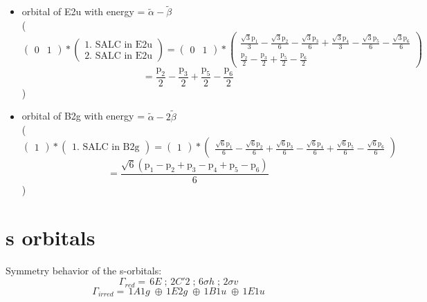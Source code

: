 \documentclass[12pt,a4paper]{article}
\begin{document}
\begin{itemize}
\item orbital of E2u with energy = 
                                $\tilde{\alpha} - \tilde{\beta}$ \\
( 
$$
\begin{pmatrix}0 & 1\end{pmatrix} * \left(\begin{array}{c}\text{1. SALC in E2u} \\ \text{2. SALC in E2u}\end{array}\right) = \begin{pmatrix}0 & 1\end{pmatrix} * \begin{pmatrix}\frac{\sqrt{3} \text{p}_{1}}{3} - \frac{\sqrt{3} \text{p}_{2}}{6} - \frac{\sqrt{3} \text{p}_{3}}{6} + \frac{\sqrt{3} \text{p}_{4}}{3} - \frac{\sqrt{3} \text{p}_{5}}{6} - \frac{\sqrt{3} \text{p}_{6}}{6}\\\frac{\text{p}_{2}}{2} - \frac{\text{p}_{3}}{2} + \frac{\text{p}_{5}}{2} - \frac{\text{p}_{6}}{2}\end{pmatrix} 
 $$ $$ = \frac{\text{p}_{2}}{2} - \frac{\text{p}_{3}}{2} + \frac{\text{p}_{5}}{2} - \frac{\text{p}_{6}}{2} 
 $$ 
 )

\item orbital of B2g with energy = 
                                $\tilde{\alpha} - 2 \tilde{\beta}$ \\
( 
$$
\begin{pmatrix}1\end{pmatrix} * \left(\begin{array}{c}\text{1. SALC in B2g}\end{array}\right) = \begin{pmatrix}1\end{pmatrix} * \begin{pmatrix}\frac{\sqrt{6} \text{p}_{1}}{6} - \frac{\sqrt{6} \text{p}_{2}}{6} + \frac{\sqrt{6} \text{p}_{3}}{6} - \frac{\sqrt{6} \text{p}_{4}}{6} + \frac{\sqrt{6} \text{p}_{5}}{6} - \frac{\sqrt{6} \text{p}_{6}}{6}\end{pmatrix} 
 $$ $$ = \frac{\sqrt{6} \left(\text{p}_{1} - \text{p}_{2} + \text{p}_{3} - \text{p}_{4} + \text{p}_{5} - \text{p}_{6}\right)}{6} 
 $$ 
 )

\end{itemize}



\newpage \section*{s orbitals}
Symmetry behavior of the s-orbitals:
$$\mathsf{\Gamma}_{red} = \,6 E\;; \,2 C'2\;; \,6 \sigma h\;; \,2 \sigma v\;$$
$$\mathsf{\Gamma}_{irred} = \,1 A1g\;\oplus{}\,1 E2g\;\oplus{}\,1 B1u\;\oplus{}\,1 E1u\;$$
\end{document}
